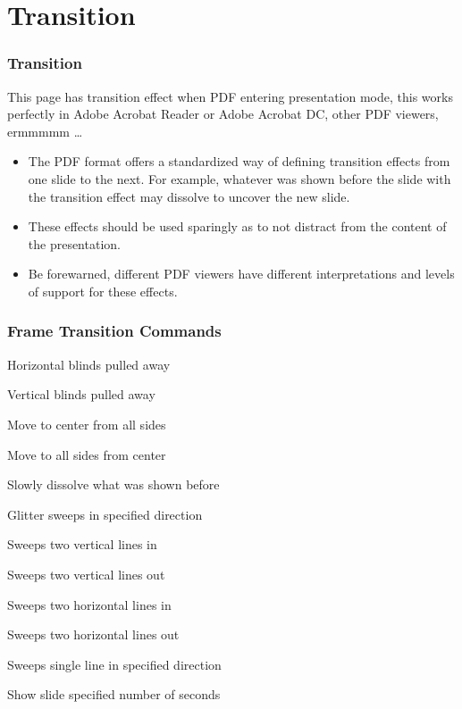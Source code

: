 \documentclass[aspectratio=169,utf8]{ctexbeamer}
\begin{document}
\section{Transition}

\begin{frame}
  \frametitle{Transition}
  \transboxin

  This page has transition effect when PDF entering presentation mode, this works perfectly in Adobe Acrobat Reader or  Adobe Acrobat DC, other PDF viewers, ermmmmm \ldots
  
  \begin{itemize}
    \item The PDF format offers a standardized way of defining transition effects from one slide to the next. For example, whatever was shown before the slide with the transition effect may dissolve to uncover the new slide.
    \item These effects should be used sparingly as to not distract from the content of the presentation.
    \item Be forewarned, different PDF viewers have different interpretations and levels of support for these effects.
  \end{itemize}
\end{frame}


\begin{frame}
  \frametitle{Frame Transition Commands}

  \begin{description}[labelwidth=\widthof{\bfseries The longest label}]
    \item[\texttt{\textbackslash{}transblindshorizontal}] Horizontal blinds pulled away
    \item[\texttt{\textbackslash{}transblindsvertical}] Vertical blinds pulled away
    \item[\texttt{\textbackslash{}transboxin}] Move to center from all sides
    \item[\texttt{\textbackslash{}transboxout}] Move to all sides from center
    \item[\texttt{\textbackslash{}transdissolve}] Slowly dissolve what was shown before
    \item[\texttt{\textbackslash{}transglitter}] Glitter sweeps in specified direction
    \item[\texttt{\textbackslash{}transslipverticalin}] Sweeps two vertical lines in
    \item[\texttt{\textbackslash{}transslipverticalout}] Sweeps two vertical lines out
    \item[\texttt{\textbackslash{}transhorizontalin}] Sweeps two horizontal lines in
    \item[\texttt{\textbackslash{}transhorizontalout}] Sweeps two horizontal lines out
    \item[\texttt{\textbackslash{}transwipe}] Sweeps single line in specified direction
    \item[\texttt{\textbackslash{}transduration\{2\}}] Show slide specified number of seconds
  \end{description}
  
\end{frame}
\end{document}
